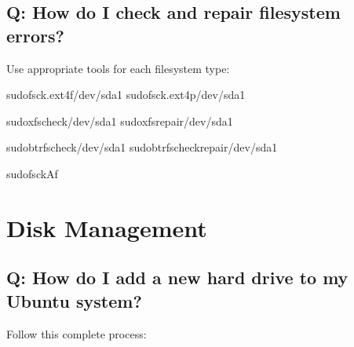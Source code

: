 \documentclass[letterpaper,10pt,english]{sphinxmanual}
\begin{document}
\subsection{Q: How do I check and repair filesystem errors?}
\label{\detokenize{faq:q-how-do-i-check-and-repair-filesystem-errors}}
\sphinxAtStartPar
{} Use appropriate tools for each filesystem type:

\begin{sphinxVerbatim}[commandchars=\\\{\}]
sudofsck.ext4\PYGZhy{}f/dev/sda1
sudofsck.ext4\PYGZhy{}p/dev/sda1

sudoxfs\PYGZus{}check/dev/sda1
sudoxfs\PYGZus{}repair/dev/sda1

sudobtrfscheck/dev/sda1
sudobtrfscheck\PYGZhy{}\PYGZhy{}repair/dev/sda1

sudofsck\PYGZhy{}A\PYGZhy{}f
\end{sphinxVerbatim}


\section{Disk Management}
\label{\detokenize{faq:disk-management}}

\subsection{Q: How do I add a new hard drive to my Ubuntu system?}
\label{\detokenize{faq:q-how-do-i-add-a-new-hard-drive-to-my-ubuntu-system}}
\sphinxAtStartPar
{} Follow this complete process:
\end{document}
